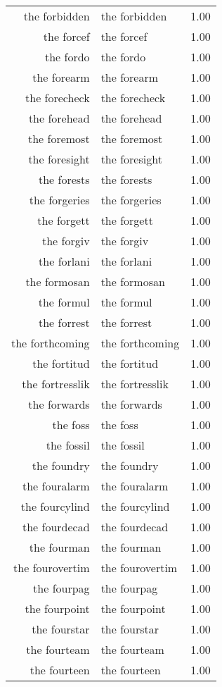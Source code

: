 \begin{table}[ht]
\begin{tabular}{rlr}
  the forbidden & the forbidden & 1.00 \\ 
  the forcef & the forcef & 1.00 \\ 
  the fordo & the fordo & 1.00 \\ 
  the forearm & the forearm & 1.00 \\ 
  the forecheck & the forecheck & 1.00 \\ 
  the forehead & the forehead & 1.00 \\ 
  the foremost & the foremost & 1.00 \\ 
  the foresight & the foresight & 1.00 \\ 
  the forests & the forests & 1.00 \\ 
  the forgeries & the forgeries & 1.00 \\ 
  the forgett & the forgett & 1.00 \\ 
  the forgiv & the forgiv & 1.00 \\ 
  the forlani & the forlani & 1.00 \\ 
  the formosan & the formosan & 1.00 \\ 
  the formul & the formul & 1.00 \\ 
  the forrest & the forrest & 1.00 \\ 
  the forthcoming & the forthcoming & 1.00 \\ 
  the fortitud & the fortitud & 1.00 \\ 
  the fortresslik & the fortresslik & 1.00 \\ 
  the forwards & the forwards & 1.00 \\ 
  the foss & the foss & 1.00 \\ 
  the fossil & the fossil & 1.00 \\ 
  the foundry & the foundry & 1.00 \\ 
  the fouralarm & the fouralarm & 1.00 \\ 
  the fourcylind & the fourcylind & 1.00 \\ 
  the fourdecad & the fourdecad & 1.00 \\ 
  the fourman & the fourman & 1.00 \\ 
  the fourovertim & the fourovertim & 1.00 \\ 
  the fourpag & the fourpag & 1.00 \\ 
  the fourpoint & the fourpoint & 1.00 \\ 
  the fourstar & the fourstar & 1.00 \\ 
  the fourteam & the fourteam & 1.00 \\ 
  the fourteen & the fourteen & 1.00 \\ 

\end{tabular}
\end{table}
